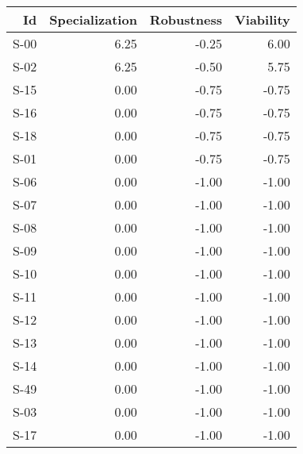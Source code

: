 \begin{tabular}{ | r | r | r | r | }
    \hline
                    Id  &  Specialization  &      Robustness  &       Viability  \\
    \hline
    \hline
                  S-00  &            6.25  &           -0.25  &            6.00  \\
    \hline
                  S-02  &            6.25  &           -0.50  &            5.75  \\
    \hline
                  S-15  &            0.00  &           -0.75  &           -0.75  \\
    \hline
                  S-16  &            0.00  &           -0.75  &           -0.75  \\
    \hline
                  S-18  &            0.00  &           -0.75  &           -0.75  \\
    \hline
                  S-01  &            0.00  &           -0.75  &           -0.75  \\
    \hline
                  S-06  &            0.00  &           -1.00  &           -1.00  \\
    \hline
                  S-07  &            0.00  &           -1.00  &           -1.00  \\
    \hline
                  S-08  &            0.00  &           -1.00  &           -1.00  \\
    \hline
                  S-09  &            0.00  &           -1.00  &           -1.00  \\
    \hline
                  S-10  &            0.00  &           -1.00  &           -1.00  \\
    \hline
                  S-11  &            0.00  &           -1.00  &           -1.00  \\
    \hline
                  S-12  &            0.00  &           -1.00  &           -1.00  \\
    \hline
                  S-13  &            0.00  &           -1.00  &           -1.00  \\
    \hline
                  S-14  &            0.00  &           -1.00  &           -1.00  \\
    \hline
                  S-49  &            0.00  &           -1.00  &           -1.00  \\
    \hline
                  S-03  &            0.00  &           -1.00  &           -1.00  \\
    \hline
                  S-17  &            0.00  &           -1.00  &           -1.00  \\

\end{tabular}

